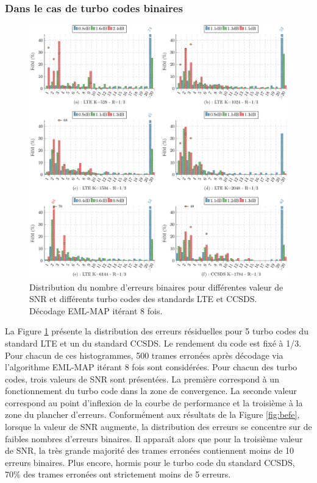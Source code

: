 \subsubsection{Dans le cas de turbo codes binaires}
\begin{figure}[!ht]
	\centering
	\hspace*{-1cm}
	\includegraphics[width=1.07\textwidth]{main/ch3_fig/be/tikz/be.pdf}
	\caption{Distribution du nombre d'erreurs binaires pour différentes valeur de SNR et différents turbo codes des 
	standards LTE et CCSDS. 
	Décodage EML-MAP itérant 8 fois. \label{fig:be}}
\end{figure}

La Figure \ref{fig:be} présente la distribution des erreurs résiduelles pour 5 turbo codes du standard LTE et un du 
standard CCSDS. Le rendement du code est fixé à 1/3. Pour chacun de ces histogrammes, 500 trames erronées
après décodage via l'algorithme EML-MAP itérant 8 fois sont considérées. 
Pour chacun des turbo codes, trois valeurs de SNR sont présentées. La première correspond à un fonctionnement du turbo 
code dans la zone de convergence. La seconde valeur correspond au point d'inflexion de la courbe de performance et la troisième à la
zone du plancher d'erreurs. Conformément aux résultats de la Figure \ref{fig:befe}, lorsque la valeur de SNR augmente, la 
distribution des erreurs se concentre sur de faibles nombres d'erreurs binaires.
Il apparaît alors que pour la troisième valeur de SNR, la très grande majorité 
des trames erronées contiennent moins de 10 erreurs binaires. 
Plus encore, hormis pour le turbo code du standard CCSDS, 70\% des trames erronées ont strictement moins de 5 erreurs.

